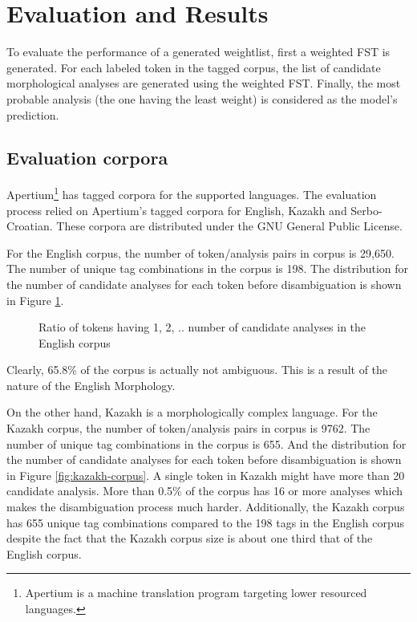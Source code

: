 \documentclass[free]{flammie}
\begin{document}
\section{Evaluation and Results}

To evaluate the performance of a generated weightlist, first a weighted FST is
generated. For each labeled token in the tagged corpus, the list of candidate
morphological analyses are generated using the weighted FST. Finally, the most
probable analysis (the one having the least weight) is considered as the model's
prediction.

\subsection{Evaluation corpora}
Apertium\footnote{Apertium is a machine translation program targeting lower
resourced languages.} has tagged corpora for the supported languages. The
evaluation process relied on Apertium's tagged corpora for English, Kazakh and
Serbo-Croatian. These corpora are distributed under the GNU General Public
License.

For the English corpus, the number of token/analysis pairs in corpus is 29,650.
The number of unique tag combinations in the corpus is 198. The distribution for
the  number of candidate analyses for each token before disambiguation is shown
in Figure \ref{fig:english-corpus}.

\begin{figure}
\caption{\label{fig:english-corpus} Ratio of tokens having 1, 2, .. number of
    candidate analyses in the English corpus}
\end{figure}


Clearly, 65.8\% of the corpus is actually not ambiguous. This is a result of the
nature of the English Morphology.

On the other hand, Kazakh is a morphologically complex language. For the Kazakh
corpus, the number of token/analysis pairs in corpus is 9762. The number of
unique tag combinations in the corpus is 655. And the distribution for the
number of candidate analyses for each token before disambiguation is shown in
Figure \ref{fig:kazakh-corpus}.  A single token in Kazakh might have more than
20 candidate analysis. More than 0.5\% of the corpus has 16 or more analyses
which makes the disambiguation process much harder. Additionally, the Kazakh
corpus has 655 unique tag combinations compared to the 198 tags in the English
corpus despite the fact that the Kazakh corpus size is about one third that of
the English corpus.
\end{document}

